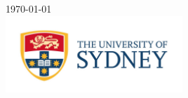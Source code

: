 \documentclass[letterpaper,10pt]{article}
\theoremstyle{mytheor}
\begin{document}
\begin{titlepage}


{\large \today}\\[3cm] %


\includegraphics[width=0.5\textwidth]{university-of-sydney-logo}\\[1cm] %
 

\vfill %

\end{titlepage}
\end{document}
